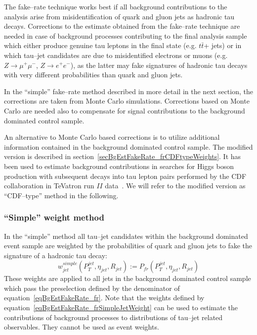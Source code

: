 The fake--rate technique works best if all background contributions to the
analysis arise from misidentification of quark and gluon jets as hadronic tau
decays.  Corrections to the estimate obtained from the fake--rate technique  are
needed in case of background processes contributing to the final analysis sample
which either produce genuine tau leptons in the final state (e.g. $t\bar{t}$+
jets) or in which tau--jet candidates are due to misidentified electrons or
muons (e.g. $Z \rightarrow \mu^{+} \mu^{-}$, $Z \rightarrow e^{+} e^{-}$), as
the latter may fake signatures of hadronic tau decays with very different
probabilities than quark and gluon jets.

In the ``simple'' fake--rate method described in more detail in the next
section, the corrections are taken from Monte Carlo simulations.  Corrections
based on Monte Carlo are needed also to compensate for signal contributions to
the background dominated control sample.

An alternative to Monte Carlo based corrections is to utilize additional
information contained in the background dominated control sample.  The modified
version is described in section~\ref{secBgEstFakeRate_frCDFtypeWeights}.  It has
been used to estimate background contributions in searches for Higgs boson
production with subsequent decays into tau lepton pairs performed by the CDF
collaboration in TeVatron run $II$ data~\cite{CDFtypeFakeRateMethod}.  We will
refer to the modified version as ``CDF--type'' method in the following.

\subsubsection{``Simple'' weight method}

In the ``simple'' method all tau--jet candidates within the background dominated
event sample are weighted by the probabilities of quark and gluon jets to fake
the signature of a hadronic tau decay:
\begin{equation}
w_{jet}^{simple} \left( P_{T}^{jet}, \eta_{jet}, R_{jet} \right) := P_{fr} \left( P_{T}^{jet}, \eta_{jet}, R_{jet} \right)
\label{eqBgEstFakeRate_frSimpleJetWeight}
\end{equation}
These weights are applied to all jets in the background dominated control sample
which pass the preselection defined by the denominator of
equation~\ref{eqBgEstFakeRate_fr}.  Note that the weights defined by
equation~\ref{eqBgEstFakeRate_frSimpleJetWeight} can be used to estimate the
contributions of background processes to distributions of tau--jet related
observables.  They cannot be used as event weights.


